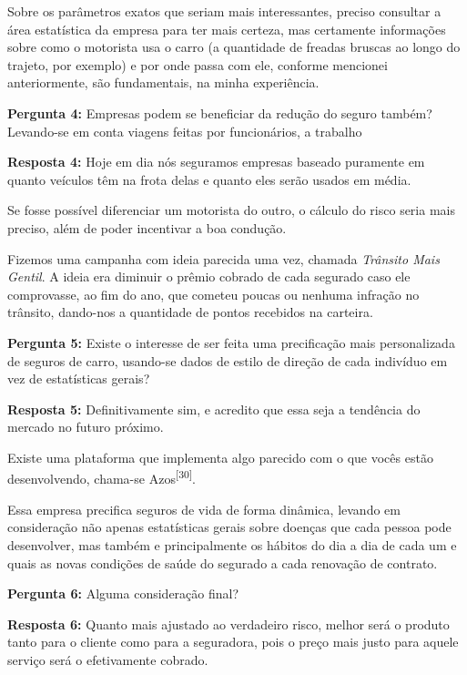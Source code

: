\noindent
Sobre os parâmetros exatos que seriam mais interessantes, preciso consultar a área estatística da empresa para ter mais certeza, mas certamente informações sobre como o motorista usa o carro (a quantidade de freadas bruscas ao longo do trajeto, por exemplo) e por onde passa com ele, conforme mencionei anteriormente, são fundamentais, na minha experiência.


\noindent
\textbf{Pergunta 4:} 
Empresas podem se beneficiar da redução do seguro também? Levando-se em conta viagens feitas por funcionários, a trabalho

\noindent
\textbf{Resposta 4:}
Hoje em dia nós seguramos empresas baseado puramente em quanto veículos têm na frota delas e quanto eles serão usados em média.

\noindent
Se fosse possível diferenciar um motorista do outro, o cálculo do risco seria mais preciso, além de poder incentivar a boa condução.

\noindent
Fizemos uma campanha com ideia parecida uma vez, chamada \textit{Trânsito Mais Gentil}. A ideia era diminuir o prêmio cobrado de cada segurado caso ele comprovasse, ao fim do ano, que cometeu poucas ou nenhuma infração no trânsito, dando-nos a quantidade de pontos recebidos na carteira.

    
\noindent
\textbf{Pergunta 5:} 
Existe o interesse de ser feita uma precificação mais personalizada de seguros de carro, usando-se dados de estilo de direção de cada indivíduo em vez de estatísticas gerais?

\noindent
\textbf{Resposta 5:}
Definitivamente sim, e acredito que essa seja a tendência do mercado no futuro próximo.

\noindent
Existe uma plataforma que implementa algo parecido com o que vocês estão desenvolvendo, chama-se Azos\textsuperscript{[30]}.

\noindent
Essa empresa precifica seguros de vida de forma dinâmica, levando em consideração não apenas estatísticas gerais sobre doenças que cada pessoa pode desenvolver, mas também e principalmente os hábitos do dia a dia de cada um e quais as novas condições de saúde do segurado a cada renovação de contrato.

    
\noindent
\textbf{Pergunta 6:} 
Alguma consideração final?
    
\noindent
\textbf{Resposta 6:} 
Quanto mais ajustado ao verdadeiro risco, melhor será o produto tanto para o cliente como para a seguradora, pois o preço mais justo para aquele serviço será o efetivamente cobrado.

